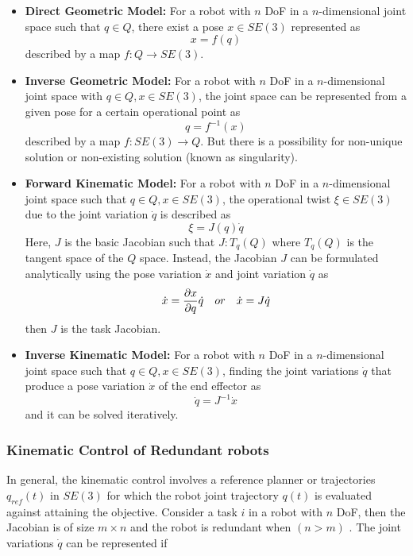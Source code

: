 \begin{itemize}
    \item \textbf{Direct Geometric Model:} For a robot with $n$ DoF in a $n$-dimensional joint space such that $q \in Q$, there exist a pose $x \in \mathit{SE(3)}$ represented as
    $$x = f(q)$$ described by a map $f:Q \rightarrow \mathit{SE(3)}$.
    
    \item \textbf{Inverse Geometric Model:} For a robot with $n$ DoF in a $n$-dimensional joint space with $q \in Q, x \in \mathit{SE(3)}$, the joint space can be represented from 
    a given pose for a certain operational point as $$q = f^{-1}(x)$$ described by a map $f: \mathit{SE(3) \rightarrow Q}$. But there is a possibility for non-unique solution or 
    non-existing solution (known as singularity).

    \item \textbf{Forward Kinematic Model:} For a robot with $n$ DoF in a $n$-dimensional joint space such that $q \in Q, x \in \mathit{SE(3)}$, the operational twist $\xi \in
     \mathit{SE(3)}$ due to the joint variation $\dot{q}$ is described as $$\xi = J(q)\dot{q}$$ Here, $J$ is the basic Jacobian such that $J : T_q(Q)$ where $T_q(Q)$ is the tangent 
     space of the $Q$ space. Instead, the Jacobian $J$ can be formulated analytically using the pose variation $\dot{x}$ and joint variation $\dot{q}$ as $$\dot{x} = \frac{\partial x}{\partial 
     q}\dot{q} \quad \mathnormal{or} \quad \dot{x} = J\dot{q}$$ then $J$ is the task Jacobian.

     \item \textbf{Inverse Kinematic Model:} For a robot with $n$ DoF in a $n$-dimensional joint space such that $q \in Q, x \in \mathit{SE(3)}$, finding the joint variations $\dot{q}$
     that produce a pose variation $\dot{x}$ of the end effector as $$\dot{q} = J^{-1} \dot{x}$$ and it can be solved iteratively.
\end{itemize}

\subsubsection{Kinematic Control of Redundant robots}

In general, the kinematic control involves a reference planner or trajectories $q_{ref}(t)$ in $\mathit{SE(3)}$ for which the robot joint trajectory $q(t)$ is evaluated against attaining
the objective. Consider a task $i$ in a robot with $n$ DoF, then the Jacobian is of size $m \times n$ and the robot is redundant when $(n > m)$ \cite{nakamura1990advanced}. The joint variations $\dot{q}$ can be represented
if

